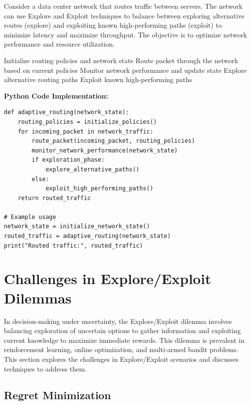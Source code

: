 \documentclass[12pt]{book} %
\begin{document}
Consider a data center network that routes traffic between servers. The network can use Explore and Exploit techniques to balance between exploring alternative routes (explore) and exploiting known high-performing paths (exploit) to minimize latency and maximize throughput. The objective is to optimize network performance and resource utilization.
\FloatBarrier
\begin{algorithm}
\caption{Explore-Exploit for Adaptive Routing}
\begin{algorithmic}[1]
\State Initialize routing policies and network state
    \State Route packet through the network based on current policies
    \State Monitor network performance and update state
        \State Explore alternative routing paths
    \Else
        \State Exploit known high-performing paths
    \EndIf
\EndFor
\end{algorithmic}
\end{algorithm}
\FloatBarrier
\textbf{Python Code Implementation:}
\FloatBarrier
\begin{lstlisting}
def adaptive_routing(network_state):
    routing_policies = initialize_policies()
    for incoming_packet in network_traffic:
        route_packet(incoming_packet, routing_policies)
        monitor_network_performance(network_state)
        if exploration_phase:
            explore_alternative_paths()
        else:
            exploit_high_performing_paths()
    return routed_traffic

# Example usage
network_state = initialize_network_state()
routed_traffic = adaptive_routing(network_state)
print("Routed traffic:", routed_traffic)
\end{lstlisting}
\FloatBarrier

\section{Challenges in Explore/Exploit Dilemmas}

In decision-making under uncertainty, the Explore/Exploit dilemma involves balancing exploration of uncertain options to gather information and exploiting current knowledge to maximize immediate rewards. This dilemma is prevalent in reinforcement learning, online optimization, and multi-armed bandit problems. This section explores the challenges in Explore/Exploit scenarios and discusses techniques to address them.

\subsection{Regret Minimization}
\end{document}
